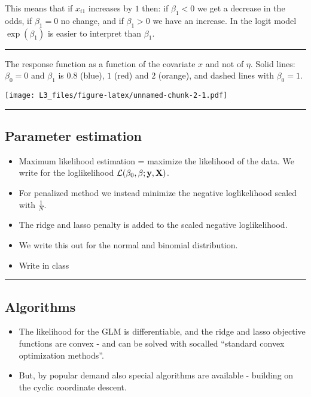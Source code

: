 \documentclass[
]{article}
\providecommand{\tightlist}{%
  \setlength{\itemsep}{0pt}\setlength{\parskip}{0pt}}
\begin{document}
This means that if \(x_{i1}\) increases by \(1\) then: if \(\beta_1<0\)
we get a decrease in the odds, if \(\beta_1=0\) no change, and if
\(\beta_1>0\) we have an increase. In the logit model \(\exp(\beta_1)\)
is easier to interpret than \(\beta_1\).

\begin{center}\rule{0.5\linewidth}{0.5pt}\end{center}

The response function as a function of the covariate \(x\) and not of
\(\eta\). Solid lines: \(\beta_0=0\) and \(\beta_1\) is \(0.8\) (blue),
\(1\) (red) and \(2\) (orange), and dashed lines with \(\beta_0=1\).

\texttt{[image: L3\_files/figure-latex/unnamed-chunk-2-1.pdf]}

\begin{center}\rule{0.5\linewidth}{0.5pt}\end{center}

\hypertarget{parameter-estimation}{%
\subsection{Parameter estimation}\label{parameter-estimation}}

\begin{itemize}
\item
  Maximum likelihood estimation = maximize the likelihood of the data.
  We write for the loglikelihood
  \({\cal L}(\beta_0,\beta; {\bf y}, {\bf X})\).
\item
  For penalized method we instead minimize the negative loglikelihood
  scaled with \(\frac{1}{N}\).
\item
  The ridge and lasso penalty is added to the scaled negative
  loglikelihood.
\item
  We write this out for the normal and binomial distribution.
\item
  Write in class
\end{itemize}

\begin{center}\rule{0.5\linewidth}{0.5pt}\end{center}

\hypertarget{algorithms}{%
\subsection{Algorithms}\label{algorithms}}

\begin{itemize}
\tightlist
\item
  The likelihood for the GLM is differentiable, and the ridge and lasso
  objective functions are convex - and can be solved with socalled
  ``standard convex optimization methods''.
\item
  But, by popular demand also special algorithms are available -
  building on the cyclic coordinate descent.
\end{itemize}
\end{document}
